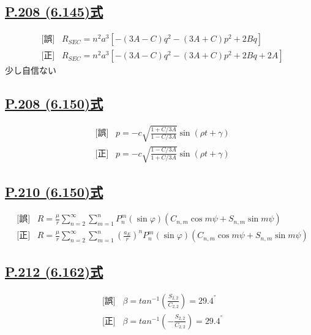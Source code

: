 \documentclass[9pt,fleqn]{bxjsarticle}
\begin{document}
\subsection*{\underline{P.208 (6.145)式}}
\begin{align*}
    &\text{[誤]} \hspace{10pt} R_{SEC} = n^2a^3\left[-(3A-C)q^2-(3A+C)p^2+2Bq\right] \\
    &\text{[正]} \hspace{10pt} R_{SEC} = n^2a^3\left[-(3A-C)q^2-(3A+C)p^2+2Bq+2A\right] 
\end{align*}
少し自信ない

\subsection*{\underline{P.208 (6.150)式}}
\begin{align*}
    &\text{[誤]} \hspace{10pt} p = -c\sqrt{\frac{1+C/3A}{1-C/3A}}\sin{({\rho}t+\gamma)} \\
    &\text{[正]} \hspace{10pt} p = -c\sqrt{\frac{1-C/3A}{1+C/3A}}\sin{({\rho}t+\gamma)} 
\end{align*}

\subsection*{\underline{P.210 (6.150)式}}
\begin{align*}
    &\text{[誤]} \hspace{10pt} R = \frac{\mu}{r}\sum_{n=2}^{\infty}\sum_{m=1}^{n}P_n^m(\sin\varphi)(C_{n,m}\cos{m\psi}+S_{n,m}\sin{m\psi}) \\
    &\text{[正]} \hspace{10pt} R = \frac{\mu}{r}\sum_{n=2}^{\infty}\sum_{m=1}^{n}\left(\frac{a_E}{r}\right)^nP_n^m(\sin\varphi)(C_{n,m}\cos{m\psi}+S_{n,m}\sin{m\psi})
\end{align*}

\subsection*{\underline{P.212 (6.162)式}}
\begin{align*}
    &\text{[誤]} \hspace{10pt} \beta = tan^{-1}\left(\frac{S_{2,2}}{C_{2,2}}\right) = 29.4^° \\
    &\text{[正]} \hspace{10pt} \beta = tan^{-1}\left(-\frac{S_{2,2}}{C_{2,2}}\right) = 29.4^° 
\end{align*}
\end{document}
